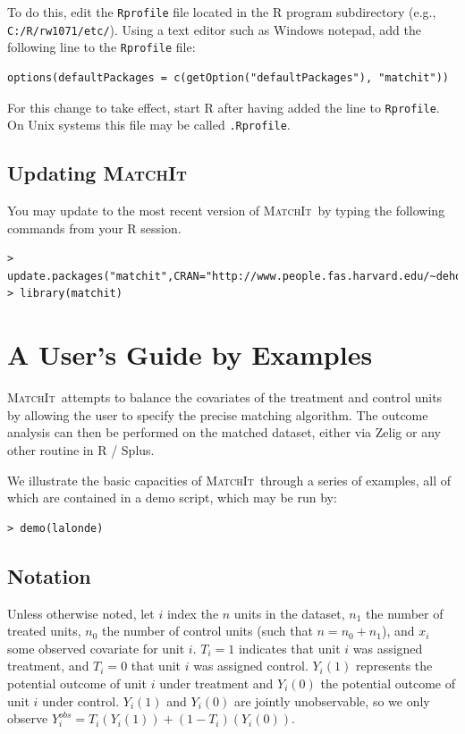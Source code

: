 \documentclass[oneside,letterpaper,titlepage]{article}
\newcommand{\MatchIt}{\textsc{MatchIt}}
\begin{document}
To do this, edit the {\tt Rprofile} file
located in the R program subdirectory (e.g.,
\texttt{C:/R/rw1071/etc/}).  Using a text editor such as
  Windows notepad, add the following line to the {\tt Rprofile} file:

\begin{verbatim}
options(defaultPackages = c(getOption("defaultPackages"), "matchit"))
\end{verbatim}

For this change to take effect, start R after having added the line to
{\tt Rprofile}.  On Unix systems this file may be called 
{\tt .Rprofile}.  

\subsection{Updating \MatchIt}
You may update to the most recent version of \MatchIt\ by typing the following
commands from your R session. 

\begin{small}
\begin{verbatim}
> update.packages("matchit",CRAN="http://www.people.fas.harvard.edu/~deho")
> library(matchit) 
\end{verbatim}
\end{small} 

\section{A User's Guide by Examples}
\MatchIt\ attempts to balance the covariates of the treatment and control units by allowing
the user to specify the precise matching algorithm.  The outcome analysis can
then be performed on the matched dataset, either via Zelig or any
other routine in R / Splus.  

We illustrate the basic capacities of \MatchIt\ through a series of
examples, all of which are contained in a demo script, which may be
run by: 

\begin{verbatim}
> demo(lalonde)
\end{verbatim}

\subsection{Notation}
Unless otherwise noted, let $i$ index the $n$ units in the dataset,
$n_1$ the number of treated units, $n_0$ the number of control units
(such that $n=n_0+n_1$),
and $x_i$ some observed covariate for unit $i$.  $T_i=1$ indicates
that unit $i$ was assigned treatment, and $T_i=0$ that unit $i$ was
assigned control.   $Y_i(1)$ represents the potential
outcome of unit $i$ under treatment and $Y_i(0)$ the potential outcome
of unit $i$ under control.  $Y_i(1)$ and $Y_i(0)$ are jointly
unobservable, so we only observe $Y_i^{obs}=T_i(Y_i(1))+(1-T_i)(Y_i(0))$.  
\end{document}
